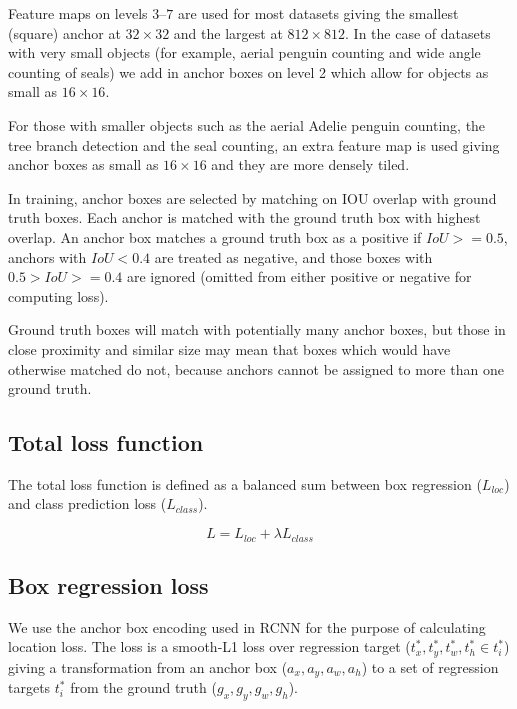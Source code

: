 Feature maps on levels $3$--$7$ are used for most datasets giving the smallest (square) anchor at $32\times32$ and the largest at $812\times812$. In the case of datasets with very small objects (for example, aerial penguin counting and wide angle counting of seals) we add in anchor boxes on level 2 which allow for objects as small as $16 \times 16$.

For those with smaller objects such as the aerial Adelie penguin counting, the tree branch detection and the seal counting, an extra feature map is used giving anchor boxes as small as $16\times16$ and they are more densely tiled.

In training, anchor boxes are selected by matching on \gls{IOU} overlap with ground truth boxes. Each anchor is matched with the ground truth box with highest overlap. An anchor box matches a ground truth box as a positive if $ IoU >= 0.5 $, anchors with $ IoU < 0.4 $ are treated as negative, and those boxes with $ 0.5 > IoU >= 0.4 $ are ignored (omitted from either positive or negative for computing loss).

Ground truth boxes will match with potentially many anchor boxes, but those in close proximity and similar size may mean that boxes which would have otherwise matched do not, because anchors cannot be assigned to more than one ground truth.

\subsection{Total loss function}

The total loss function is defined as a balanced sum between box regression ($L_{loc}$) and class prediction loss ($L_{class}$). 

\begin{equation}
L  = L_{loc} + \lambda L_{class}
\label{eq:loss_total}
\end{equation}

\subsection {Box regression loss}
\label{sec:regression}


We use the anchor box encoding used in \gls{RCNN} \cite{Wang2017} for the purpose of calculating location loss. The loss is a smooth-L1 loss over regression target ($t^*_x, t^*_y, t^*_w, t^*_h \in t^*_i$) giving a transformation from an anchor box ($a_x, a_y, a_w, a_h$)  to a set of regression targets $t^*_i$ from the ground truth ($g_x, g_y, g_w, g_h$). 

